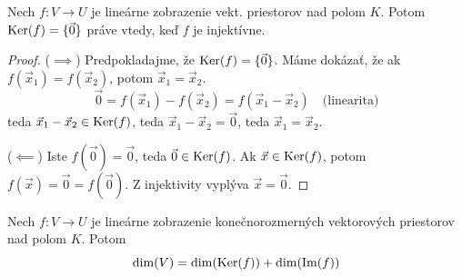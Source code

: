 \begin{tvrdenie} \label{tvr:injektivita}
Nech $f: V \to U$ je lineárne zobrazenie vekt. priestorov nad polom $K$. Potom $\operatorname{Ker}(f) = \{ \vec{0} \}$ práve vtedy, keď $f$ je injektívne.
\end{tvrdenie}

\begin{proof}
($\implies$) Predpokladajme, že $\operatorname{Ker}(f) = \{ \vec{0} \}$. Máme dokázať, že ak $f(\vec{x}_1) = f(\vec{x}_2)$, potom $\vec{x}_1 = \vec{x}_2$.
\[ \vec{0} = f(\vec{x}_1) - f(\vec{x}_2) = f(\vec{x}_1 - \vec{x}_2) \quad \text{(linearita)} \]
teda $\vec{x}_1 - \vec{x}_2 \in \operatorname{Ker}(f)$, teda $\vec{x}_1 - \vec{x}_2 = \vec{0}$, teda $\vec{x}_1 = \vec{x}_2$.

($\impliedby$) Iste $f(\vec{0}) = \vec{0}$, teda $\vec{0} \in \operatorname{Ker}(f)$. Ak $\vec{x} \in \operatorname{Ker}(f)$, potom $f(\vec{x}) = \vec{0} = f(\vec{0})$. Z injektivity vyplýva $\vec{x} = \vec{0}$.
\end{proof}

\begin{veta} \label{veta:jadro_obraz}
Nech $f: V \to U$ je lineárne zobrazenie konečnorozmerných vektorových priestorov nad polom $K$. Potom
\[ \dim(V) = \dim(\operatorname{Ker}(f)) + \dim(\operatorname{Im}(f)) \]
\end{veta}

